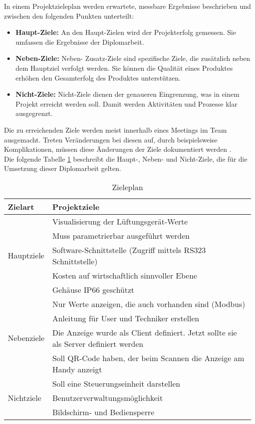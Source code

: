 In einem Projektzieleplan werden erwartete, messbare Ergebnisse beschrieben und zwischen den folgenden Punkten unterteilt:
\begin{itemize}
	\item \textbf{Haupt-Ziele:} An den Haupt-Zielen wird der  Projekterfolg gemessen. Sie umfassen die Ergebnisse der Diplomarbeit.
	\item \textbf{Neben-Ziele:} Neben- \bzw Zusatz-Ziele sind spezifische Ziele, die zusätzlich neben dem Hauptziel verfolgt werden. Sie können die Qualität eines Produktes erhöhen \bzw den Gesamterfolg des Produktes unterstützen.
	\item \textbf{Nicht-Ziele:} Nicht-Ziele dienen der genaueren Eingrenzung, was in einem Projekt erreicht werden soll. Damit werden Aktivitäten und Prozesse klar ausgegrenzt.
\end{itemize}
Die zu erreichenden Ziele werden meist innerhalb eines Meetings im Team ausgemacht. Treten Veränderungen bei diesen auf, durch beispielsweise Komplikationen, müssen diese Änderungen der Ziele dokumentiert werden \cite[vgl.][]{Diplomarbeiten-bbs:o.J.}. \\ 
Die folgende Tabelle \ref{tab:ziele_plan} beschreibt die Haupt-, Neben- und Nicht-Ziele, die für die Umsetzung dieser Diplomarbeit gelten.
\begin{table}[htpb]
	\caption{Zieleplan}
	\label{tab:ziele_plan}
	\begin{tabular}{p{} | p{}}
		\toprule
		\textbf{Zielart} & \textbf{Projektziele} \\
		\midrule
		& Visualisierung der Lüftungsgerät-Werte
		\\
		& Muss parametrierbar ausgeführt werden
		\\
		Hauptziele & Software-Schnittstelle (Zugriff mittels RS323 Schnittstelle)
		\\
		& Kosten auf wirtschaftlich sinnvoller Ebene
		\\
		& Gehäuse IP66 geschützt 
		\\
		\midrule
		& Nur Werte anzeigen, die auch vorhanden sind (Modbus)
		\\
		& Anleitung für User und Techniker erstellen
		\\
		Nebenziele & Die Anzeige wurde als Client definiert. Jetzt sollte sie als Server definiert werden
		\\
		& Soll QR-Code haben, der beim Scannen die Anzeige am Handy anzeigt
		\\
		\midrule
		& Soll eine Steuerungseinheit darstellen
		\\
		Nichtziele & Benutzerverwaltungsmöglichkeit
		\\
		& Bildschirm- und Bediensperre
		\\
		\bottomrule
	\end{tabular}
\end{table}